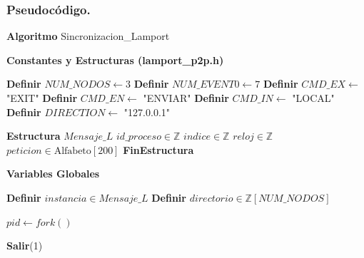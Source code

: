 \subsubsection{Pseudocódigo.}

\begin{tcolorbox}[colback=white, colframe=azul_unam, title=Pseudocódigo: sinc\_lamport.c (P2P), breakable]

\textbf{Algoritmo} Sincronizacion\_Lamport


\textbf{Constantes y Estructuras (lamport\_p2p.h)}

\begin{algorithmic}[1]

\State \textbf{Definir} $NUM\_NODOS \gets 3$
\State \textbf{Definir} $NUM\_EVENT0 \gets 7$
\State \textbf{Definir} $CMD\_EX \gets$ "EXIT"
\State \textbf{Definir} $CMD\_EN \gets$ "ENVIAR"
\State \textbf{Definir} $CMD\_IN \gets$ "LOCAL"
\State \textbf{Definir} $DIRECTION \gets$ "127.0.0.1"

\vspace{0.2cm}

\State \textbf{Estructura} $Mensaje\_L$
\State \quad $id\_proceso \in \mathbb{Z}$
\State \quad $indice \in \mathbb{Z}$
\State \quad $reloj \in \mathbb{Z}$
\State \quad $peticion \in \text{Alfabeto}[200]$
\State \textbf{FinEstructura}

\end{algorithmic}

\vspace{0.3cm}


\textbf{Variables Globales}

\begin{algorithmic}[1]
\State \textbf{Definir} $instancia \in Mensaje\_L$
\State \textbf{Definir} $directorio \in \mathbb{Z}[NUM\_NODOS]$
\end{algorithmic}

\vspace{0.3cm}

\begin{algorithmic}[1]
    

\State $pid \gets fork()$

    \State \textbf{Salir}(1)
\EndIf


\end{algorithmic}
\end{tcolorbox}

